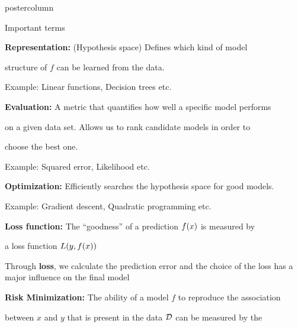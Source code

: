 \documentclass{beamer}
\begin{document}
\begin{frame}[fragile]{}
\begin{columns}
\begin{column}{.31\textwidth}
\begin{beamercolorbox}[center]{postercolumn}
\begin{minipage}{.98\textwidth}
{\begin{myblock}{Important terms}
\begin{codebox}
							 \textbf{Representation: }(Hypothesis space) Defines which kind of model
						\end{codebox}
						\begin{codebox}
						 structure of \(f\) can be learned from the data.
						\end{codebox}
						\hspace*{1ex}Example: Linear functions, Decision trees etc.
						\\
						\begin{codebox}
						    \textbf{Evaluation: }A metric that quantifies how well a specific model performs
						\end{codebox}
						\begin{codebox}
						    on a given data set. Allows us to rank candidate models in order to
						\end{codebox}
						\begin{codebox}
						    choose the best one.
						\end{codebox}
						\hspace*{1ex}Example: Squared error, Likelihood etc.
						\\
						\begin{codebox}
							 \textbf{Optimization: }Efficiently searches the hypothesis space for good models.
						\end{codebox}
						\hspace*{1ex}Example: Gradient descent, Quadratic programming etc.
						\\
						\begin{codebox}
							 \textbf{Loss function: }The \enquote{goodness} of a prediction $f(x)$ is measured by
						\end{codebox}
						\begin{codebox}
							 a loss function $L(y, f(x))$
						\end{codebox} \hspace*{1ex}Through \textbf{loss}, we calculate the prediction error and the choice of the \hspace*{1ex}loss has a major influence on the final model
						\\
	                    \begin{codebox}
							 \textbf{Risk Minimization: }The ability of a model $f$ to reproduce the association
						\end{codebox}
						\begin{codebox}
							 between $x$ and $y$ that is present in the data $\mathcal{D}$ can be measured by the
						\end{codebox}

\end{myblock}}
\end{minipage}
\end{beamercolorbox}
\end{column}
\end{columns}
\end{frame}
\end{document}
